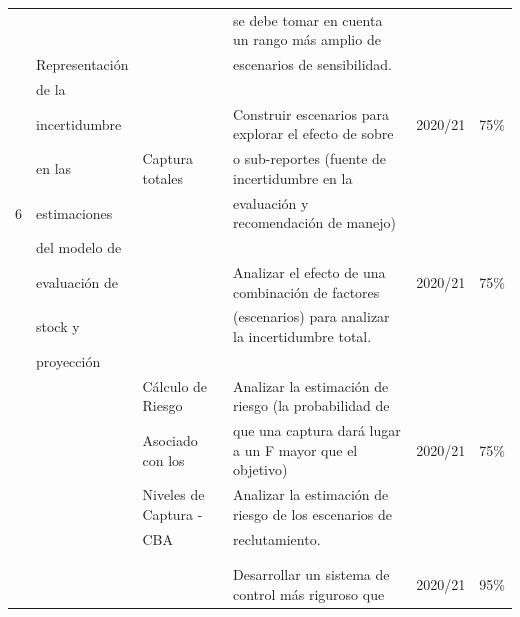 \documentclass[
  spanish,
]{article}
\begin{document}
\begin{table}[h]
{\begin{tabular}{|c|l|l|l|c|c|}
     &               &                      & se debe tomar en cuenta un rango más amplio de        &         & \\
     & Representación&                      & escenarios de sensibilidad.                           &         & \\
     & de la         &                      &                                                       &         & \\
     & incertidumbre &                      & Construir escenarios para explorar el efecto de sobre & 2020/21 & 75\% \\ 
     & en las        & Captura totales      & o sub-reportes  (fuente de incertidumbre en la        &         & \\
  6  & estimaciones  &                      & evaluación y recomendación de manejo)                 &         & \\
     & del modelo de &                      &                                                       &         & \\
     & evaluación de &                      & Analizar el efecto de una combinación de factores     & 2020/21 & 75\% \\ 
     & stock y       &                      & (escenarios) para analizar la incertidumbre total.    &         & \\
     & proyección    &                      &                                                       &         & \\
     &               & Cálculo de Riesgo    & Analizar la estimación de riesgo (la probabilidad de  &         & \\ 
     &               & Asociado con los     & que una captura dará lugar a un F mayor que el objetivo)&2020/21 & 75\% \\ 
     &               & Niveles de Captura - & Analizar la estimación de riesgo de los escenarios de &         & \\
     &               & CBA                  & reclutamiento.                                        &         & \\
     &               &                      &                                                       &         & \\ \hline
     &               &                      &                                                       &         & \\
     &               &                      & Desarrollar un sistema de control más riguroso que    & 2020/21 & 95\% \\ 

\end{tabular}}
\end{table}
\end{document}
